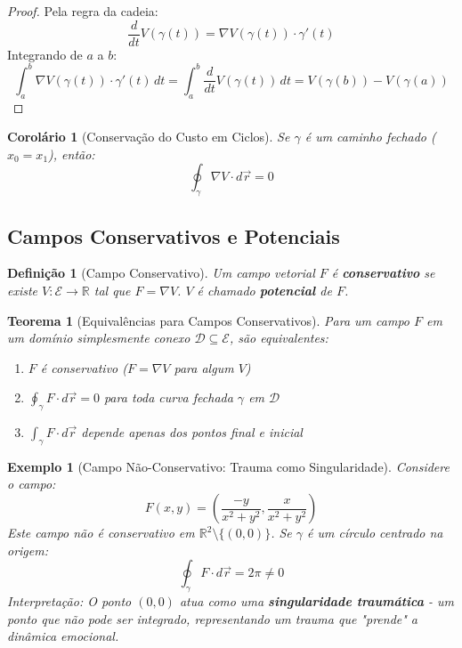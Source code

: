 \documentclass[12pt, a4paper]{article}
\newtheorem{definition}{Definição}
\newtheorem{theorem}{Teorema}
\newtheorem{corollary}{Corolário}
\newtheorem{example}{Exemplo}
\begin{document}
\begin{proof}
Pela regra da cadeia:
\[
\frac{d}{dt} V(\gamma(t)) = \nabla V(\gamma(t)) \cdot \gamma'(t)
\]
Integrando de $a$ a $b$:
\[
\int_a^b \nabla V(\gamma(t)) \cdot \gamma'(t) \, dt = \int_a^b \frac{d}{dt} V(\gamma(t)) \, dt = V(\gamma(b)) - V(\gamma(a))
\]
\end{proof}

\begin{corollary}[Conservação do Custo em Ciclos]
Se $\gamma$ é um caminho fechado ($x_0 = x_1$), então:
\[
\oint_\gamma \nabla V \cdot d\vec{r} = 0
\]
\end{corollary}

\subsection{Campos Conservativos e Potenciais}

\begin{definition}[Campo Conservativo]
Um campo vetorial $F$ é \textbf{conservativo} se existe $V: \mathcal{E} \to \mathbb{R}$ tal que $F = \nabla V$. $V$ é chamado \textbf{potencial} de $F$.
\end{definition}

\begin{theorem}[Equivalências para Campos Conservativos]
Para um campo $F$ em um domínio simplesmente conexo $\mathcal{D} \subseteq \mathcal{E}$, são equivalentes:
\begin{enumerate}
\item $F$ é conservativo ($F = \nabla V$ para algum $V$)
\item $\oint_\gamma F \cdot d\vec{r} = 0$ para toda curva fechada $\gamma$ em $\mathcal{D}$
\item $\int_\gamma F \cdot d\vec{r}$ depende apenas dos pontos final e inicial
\end{enumerate}
\end{theorem}

\begin{example}[Campo Não-Conservativo: Trauma como Singularidade]
Considere o campo:
\[
F(x,y) = \left( \frac{-y}{x^2+y^2}, \frac{x}{x^2+y^2} \right)
\]
Este campo não é conservativo em $\mathbb{R}^2 \setminus \{(0,0)\}$. Se $\gamma$ é um círculo centrado na origem:
\[
\oint_\gamma F \cdot d\vec{r} = 2\pi \neq 0
\]
Interpretação: O ponto $(0,0)$ atua como uma \textbf{singularidade traumática} - um ponto que não pode ser integrado, representando um trauma que "prende" a dinâmica emocional.
\end{example}
\end{document}
